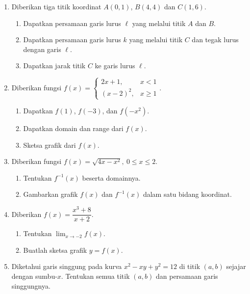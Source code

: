 \documentclass[10pt,openany,a4paper]{article}
\theoremstyle{definition}
\theoremstyle{definition}
\theoremstyle{plain}
\begin{document}
\newpage

\begin{enumerate}
    \item Diberikan tiga titik koordinat $A(0,1)$, $B(4,4)$ dan $C(1,6)$.
    \begin{enumerate}
        \item Dapatkan persamaan garis lurus $\ell$ yang melalui titik $A$ dan $B$.
        \item Dapatkan persamaan garis lurus $k$ yang melalui titik $C$ dan tegak lurus dengan garis $\ell$.
        \item Dapatkan jarak titik $C$ ke garis lurus $\ell$.
    \end{enumerate}

    \item Diberikan fungsi $f(x)=\begin{cases}
        2x+1, & x<1\\
        (x-2)^2, & x\geq 1
    \end{cases}$.
    \begin{enumerate}
        \item Dapatkan $f(1)$, $f(-3)$, dan $f(-x^2)$.
        \item Dapatkan domain dan range dari $f(x)$.
        \item Sketsa grafik dari $f(x)$.
    \end{enumerate}

    \item Diberikan fungsi $f(x)=\sqrt{4x-x^2},\ 0\leq x\leq 2$.
    \begin{enumerate}
        \item Tentukan $f^{-1}(x)$ beserta domainnya.
        \item Gambarkan grafik $f(x)$ dan $f^{-1}(x)$ dalam satu bidang koordinat.
    \end{enumerate}

    \item Diberikan $f(x)=\dfrac{x^3+8}{x+2}$.
    \begin{enumerate}
        \item Tentukan $\displaystyle\lim_{x\to -2}f(x)$.
        \item Buatlah sketsa grafik $y=f(x)$.
    \end{enumerate}

    \item Diketahui garis singgung pada kurva $x^2-xy+y^2=12$ di titik $(a,b)$ sejajar dengan sumbu-$x$. Tentukan semua titik $(a,b)$ dan persamaan garis singgungnya.
\end{enumerate}
\end{document}
